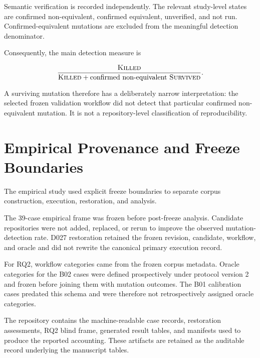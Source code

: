 Semantic verification is recorded independently. The relevant study-level
states are confirmed non-equivalent, confirmed equivalent, unverified, and not
run. Confirmed-equivalent mutations are excluded from the meaningful detection
denominator.

Consequently, the main detection measure is

\[
\frac{
  \textsc{Killed}
}{
  \textsc{Killed}
  +
  \text{confirmed non-equivalent \textsc{Survived}}
}.
\]

A surviving mutation therefore has a deliberately narrow interpretation: the
selected frozen validation workflow did not detect that particular confirmed
non-equivalent mutation. It is not a repository-level classification of
reproducibility.


\section{Empirical Provenance and Freeze Boundaries}
\label{app:freeze-boundaries}

The empirical study used explicit freeze boundaries to separate corpus
construction, execution, restoration, and analysis.

The 39-case empirical frame was frozen before post-freeze analysis. Candidate
repositories were not added, replaced, or rerun to improve the observed
mutation-detection rate. D027 restoration retained the frozen revision,
candidate, workflow, and oracle and did not rewrite the canonical primary
execution record.

For RQ2, workflow categories came from the frozen corpus metadata. Oracle
categories for the B02 cases were defined prospectively under protocol version
2 and frozen before joining them with mutation outcomes. The B01 calibration
cases predated this schema and were therefore not retrospectively assigned
oracle categories.

The repository contains the machine-readable case records, restoration
assessments, RQ2 blind frame, generated result tables, and manifests used to
produce the reported accounting. These artifacts are retained as the auditable
record underlying the manuscript tables.
